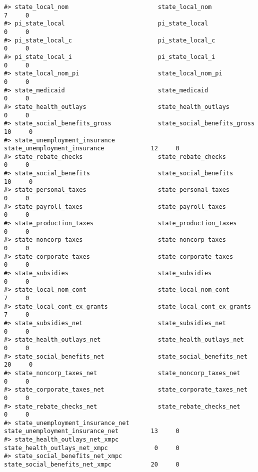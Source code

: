 \documentclass[
]{article}
\begin{document}
\begin{verbatim}
#> state_local_nom                         state_local_nom                           7     0
#> pi_state_local                          pi_state_local                            0     0
#> pi_state_local_c                        pi_state_local_c                          0     0
#> pi_state_local_i                        pi_state_local_i                          0     0
#> state_local_nom_pi                      state_local_nom_pi                        0     0
#> state_medicaid                          state_medicaid                            0     0
#> state_health_outlays                    state_health_outlays                      0     0
#> state_social_benefits_gross             state_social_benefits_gross              10     0
#> state_unemployment_insurance            state_unemployment_insurance             12     0
#> state_rebate_checks                     state_rebate_checks                       0     0
#> state_social_benefits                   state_social_benefits                    10     0
#> state_personal_taxes                    state_personal_taxes                      0     0
#> state_payroll_taxes                     state_payroll_taxes                       0     0
#> state_production_taxes                  state_production_taxes                    0     0
#> state_noncorp_taxes                     state_noncorp_taxes                       0     0
#> state_corporate_taxes                   state_corporate_taxes                     0     0
#> state_subsidies                         state_subsidies                           0     0
#> state_local_nom_cont                    state_local_nom_cont                      7     0
#> state_local_cont_ex_grants              state_local_cont_ex_grants                7     0
#> state_subsidies_net                     state_subsidies_net                       0     0
#> state_health_outlays_net                state_health_outlays_net                  0     0
#> state_social_benefits_net               state_social_benefits_net                20     0
#> state_noncorp_taxes_net                 state_noncorp_taxes_net                   0     0
#> state_corporate_taxes_net               state_corporate_taxes_net                 0     0
#> state_rebate_checks_net                 state_rebate_checks_net                   0     0
#> state_unemployment_insurance_net        state_unemployment_insurance_net         13     0
#> state_health_outlays_net_xmpc           state_health_outlays_net_xmpc             0     0
#> state_social_benefits_net_xmpc          state_social_benefits_net_xmpc           20     0

\end{verbatim}
\end{document}
